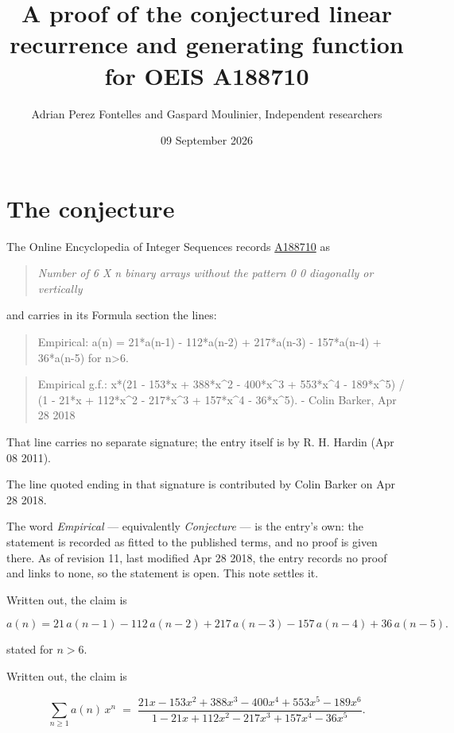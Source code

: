 \documentclass[11pt]{article}
\title{A proof of the conjectured linear recurrence and generating function for OEIS A188710}
\author{Adrian Perez Fontelles and Gaspard Moulinier, Independent researchers}
\date{09 September 2026}
\theoremstyle{definition}
\begin{document}
\maketitle
\section{The conjecture}

The Online Encyclopedia of Integer Sequences records \href{https://oeis.org/A188710}{A188710} as

\begin{quote}\itshape Number of 6 X n binary arrays without the pattern 0 0 diagonally or vertically\end{quote}

and carries in its Formula section the lines:

\begin{quote}\ttfamily Empirical: a(n) = 21*a(n-1) - 112*a(n-2) + 217*a(n-3) - 157*a(n-4) + 36*a(n-5) for n>6.\end{quote}

\begin{quote}\ttfamily Empirical g.f.: x*(21 - 153*x + 388*x\textasciicircum{}2 - 400*x\textasciicircum{}3 + 553*x\textasciicircum{}4 - 189*x\textasciicircum{}5) / (1 - 21*x + 112*x\textasciicircum{}2 - 217*x\textasciicircum{}3 + 157*x\textasciicircum{}4 - 36*x\textasciicircum{}5). - Colin Barker, Apr 28 2018\end{quote}

That line carries no separate signature; the entry itself is by R. H. Hardin (Apr 08 2011).

The line quoted ending in that signature is contributed by Colin Barker on Apr 28 2018.

The word {\itshape Empirical} --- equivalently {\itshape Conjecture} --- is the entry's own: the statement is recorded as fitted to the published terms, and no proof is given there. As of revision 11, last modified Apr 28 2018, the entry records no proof and links to none, so the statement is open. This note settles it.

Written out, the claim is

\[a(n) = 21\,a(n-1) - 112\,a(n-2) + 217\,a(n-3) - 157\,a(n-4) + 36\,a(n-5).\]

stated for $n > 6$.

Written out, the claim is

\[\sum_{n \ge 1} a(n)\,x^n \;=\; \frac{21x - 153x^{2} + 388x^{3} - 400x^{4} + 553x^{5} - 189x^{6}}{1 - 21x + 112x^{2} - 217x^{3} + 157x^{4} - 36x^{5}}.\]
\end{document}
